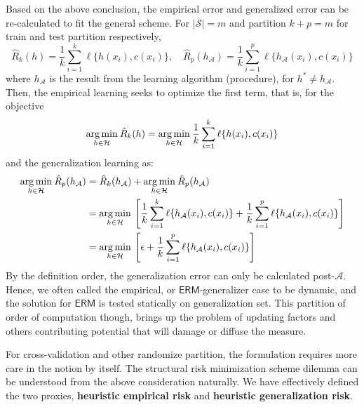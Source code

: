 \documentclass[10pt,oneside,oldfontcommands,dvipsnames,article]{memoir}
\begin{document}
Based on the above conclusion, the empirical error and generalized error can be re-calculated to fit the general scheme. For $\lvert \mathcal{S}\rvert = m$ and partition $k+p=m$ for train and test partition respectively, 
\begin{equation}
    \hat{R}_{k}(h) = \frac{1}{k} \sum^{k}_{i=1} \ell\{h(x_{i}),c(x_{i})\},\quad \hat{R}_{p}(h_{\mathcal{A}}) = \frac{1}{k} \sum^{p}_{i=1} \ell\{h_{\mathcal{A}}(x_{i}),c(x_{i})\}
\end{equation}
where $h_{\mathcal{A}}$ is the result from the learning algorithm (procedure), for $h^{*}\neq h_{\mathcal{A}}$. Then, the empirical learning seeks to optimize the first term, that is, for the objective 
\begin{equation}
    \underset{h\in \mathcal{H}}{\operatorname*{arg\,min}}\: \hat{R}_{k}(h) = \underset{h\in \mathcal{H}}{\operatorname*{arg\,min}}\:\frac{1}{k} \sum^{k}_{i=1} \ell\{h(x_{i}),c(x_{i})\}
\end{equation}
and the generalization learning as: 
\begin{equation}
    \begin{split}
        \underset{h\in \mathcal{H}}{\operatorname*{arg\,min}}\: \hat{R}_{p}(h_{\mathcal{A}}) 
        & = \hat{R}_{k}(h_{\mathcal{A}}) + \underset{h\in \mathcal{H}}{\operatorname*{arg\,min}}\:\hat{R}_{p}(h_{\mathcal{A}})\\
        & =  \underset{h\in \mathcal{H}}{\operatorname*{arg\,min}}\: \left[\frac{1}{k} \sum^{k}_{i=1} \ell\{h_{\mathcal{A}}(x_{i}),c(x_{i})\} + \frac{1}{k} \sum^{p}_{i=1} \ell\{h_{\mathcal{A}}(x_{i}),c(x_{i})\}\right]\\
        & = \underset{h\in \mathcal{H}}{\operatorname*{arg\,min}}\: \left[\epsilon + \frac{1}{k} \sum^{p}_{i=1} \ell\{h_{\mathcal{A}}(x_{i}),c(x_{i})\}\right]
    \end{split}
\end{equation}
By the definition order, the generalization error can only be calculated post-$\mathcal{A}$. Hence, we often called the empirical, or $\mathsf{ERM}$-generalizer case to be dynamic, and the solution for $\mathsf{ERM}$ is tested statically on generalization set. This partition of order of computation though, brings up the problem of updating factors and others contributing potential that will damage or diffuse the measure. 

For cross-validation and other randomize partition, the formulation requires more care in the notion by itself. The structural risk minimization scheme dilemma can be understood from the above consideration naturally. We have effectively defined the two proxies, \textbf{heuristic empirical risk} and \textbf{heuristic generalization risk}. 
\end{document}
